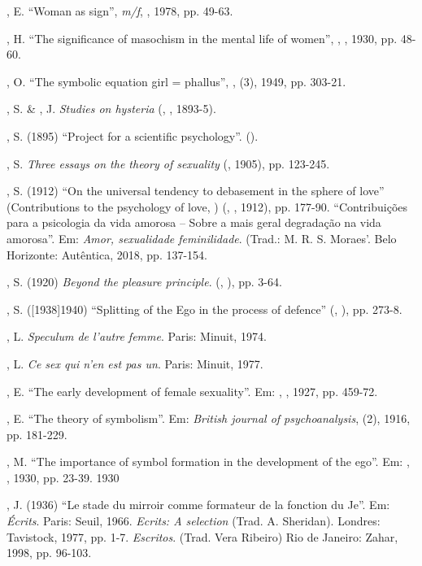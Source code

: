 , E. ``Woman as sign'', \emph{m/f}, , 1978, pp. 49-63.

, H. ``The significance of masochism in the mental life of women'',
\emph{}, , 1930, pp. 48-60.

, O. ``The symbolic equation girl = phallus'', \emph{}, 
(3), 1949, pp. 303-21.

, S. \& , J. \emph{Studies on hysteria} (, , 1893-5).

, S. (1895) ``Project for a scientific psychology''. ().

, S. \emph{Three essays on the theory of sexuality} (,
1905), pp. 123-245.

, S. (1912) ``On the universal tendency to debasement in the sphere
of love'' (Contributions to the psychology of love, ) (, , 1912),
pp. 177-90. ``Contribuições para a psicologia da vida amorosa -- Sobre a
mais geral degradação na vida amorosa''. Em: \emph{Amor, sexualidade
feminilidade}. (Trad.: M. R. S. Moraes'. Belo Horizonte: Autêntica,
2018, pp. 137-154.

, S. (1920) \emph{Beyond the pleasure principle}. (, ), pp.
3-64.

, S. ({[}1938{]}1940) ``Splitting of the Ego in the process of
defence'' (, ), pp. 273-8.

, L. \emph{Speculum de l'autre femme}. Paris: Minuit, 1974.

, L. \emph{Ce sex qui n'en est pas un}. Paris: Minuit, 1977.

, E. ``The early development of female sexuality''. Em:
\emph{}, , 1927, pp. 459-72.

, E. ``The theory of symbolism''. Em: \emph{British journal of
psychoanalysis},  (2), 1916, pp. 181-229.

, M. ``The importance of symbol formation in the development of the
ego''. Em: \emph{}, , 1930, pp. 23-39. 1930

, J. (1936) ``Le stade du mirroir comme formateur de la fonction du
Je''. Em: \emph{Écrits}. Paris: Seuil, 1966. \emph{Ecrits: A
selection} (Trad. A. Sheridan). Londres: Tavistock, 1977, pp. 1-7.
\emph{Escritos}. (Trad. Vera Ribeiro) Rio de Janeiro: Zahar, 1998,
pp. 96-103.

